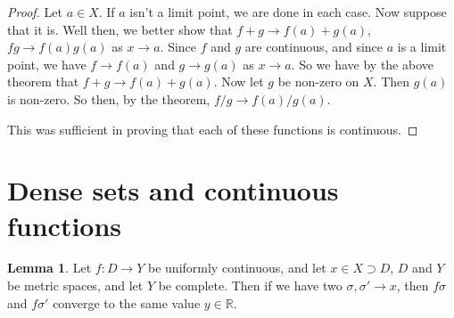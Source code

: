 \documentclass[11pt]{article}
\newcommand{\R}{\mathbb{R}}
\theoremstyle{definition}
\newtheorem{lemma}{Lemma}
\begin{document}
\begin{proof}
Let $a\in X$. If $a$ isn't a limit point, we are done in each case. Now suppose that it is. Well then, we better show that $f+ g\to f(a) + g(a)$, $ fg \to f(a)g(a) $ as $x\to a$. Since $f$ and $g$ are continuous, and since $a$ is a limit point, we have $ f\to f(a) $ and $g\to g(a)$ as $x\to a$. So we have by the above theorem that $f+g\to f(a) + g(a)$. Now let $g$ be non-zero on $X$. Then $g(a)$ is non-zero. So then, by the theorem, $ f/g \to f(a)/g(a) $.

This was sufficient in proving that each of these functions is continuous.
\end{proof}

\section{Dense sets and continuous functions}



\begin{lemma}
Let $f:D\to Y$ be uniformly continuous, and let $x\in X\supset D$, $D$ and $Y$ be metric spaces, and let $ Y $ be complete. Then if we have two $\sigma, \sigma'\to x$, then $f\sigma$ and $f\sigma'$ converge to the same value $y\in \R$.  
\end{lemma}
\end{document}

